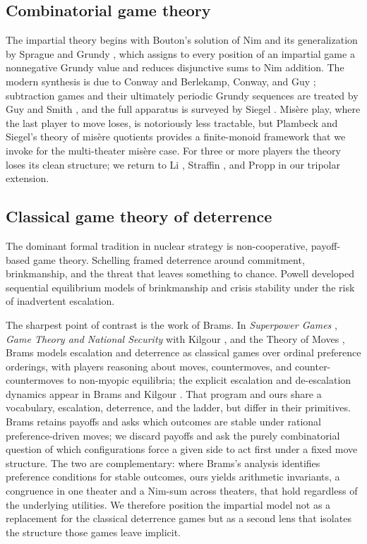 \documentclass[11pt]{article}
\theoremstyle{plain}
\theoremstyle{definition}
\theoremstyle{remark}
\begin{document}
\subsection{Combinatorial game theory}
The impartial theory begins with Bouton's solution of Nim \citep{bouton1901}
and its generalization by Sprague \citep{sprague1935} and Grundy
\citep{grundy1939}, which assigns to every position of an impartial game a
nonnegative Grundy value and reduces disjunctive sums to Nim addition. The
modern synthesis is due to Conway \citep{conway1976} and Berlekamp, Conway,
and Guy \citep{bcg1982}; subtraction games and their ultimately periodic
Grundy sequences are treated by Guy and Smith \citep{guysmith1956}, and the
full apparatus is surveyed by Siegel \citep{siegel2013}. Mis\`ere play, where
the last player to move loses, is notoriously less tractable, but Plambeck
and Siegel's theory of mis\`ere quotients \citep{plambeck2005,
plambecksiegel2008} provides a finite-monoid framework that we invoke for
the multi-theater mis\`ere case. For three or more players the theory loses
its clean structure; we return to Li \citep{li1978}, Straffin
\citep{straffin1985}, and Propp \citep{propp2000} in our tripolar extension.

\subsection{Classical game theory of deterrence}
The dominant formal tradition in nuclear strategy is non-cooperative,
payoff-based game theory. Schelling \citep{schelling1960, schelling1966}
framed deterrence around commitment, brinkmanship, and the threat that
leaves something to chance. Powell \citep{powell1990, powell1988} developed
sequential equilibrium models of brinkmanship and crisis stability under the
risk of inadvertent escalation.

The sharpest point of contrast is the work of Brams. In \emph{Superpower
Games} \citep{brams1985}, \emph{Game Theory and National Security} with
Kilgour \citep{bramskilgour1988}, and the Theory of Moves \citep{brams1994},
Brams models escalation and deterrence as classical games over ordinal
preference orderings, with players reasoning about moves, countermoves, and
counter-countermoves to non-myopic equilibria; the explicit escalation and
de-escalation dynamics appear in Brams and Kilgour \citep{bramskilgour1987}.
That program and ours share a vocabulary, escalation, deterrence, and the
ladder, but differ in their primitives. Brams retains payoffs and asks which
outcomes are stable under rational preference-driven moves; we discard
payoffs and ask the purely combinatorial question of which configurations
force a given side to act first under a fixed move structure. The two are
complementary: where Brams's analysis identifies preference conditions for
stable outcomes, ours yields arithmetic invariants, a congruence in one
theater and a Nim-sum across theaters, that hold regardless of the
underlying utilities. We therefore position the impartial model not as a
replacement for the classical deterrence games but as a second lens that
isolates the structure those games leave implicit.
\end{document}
